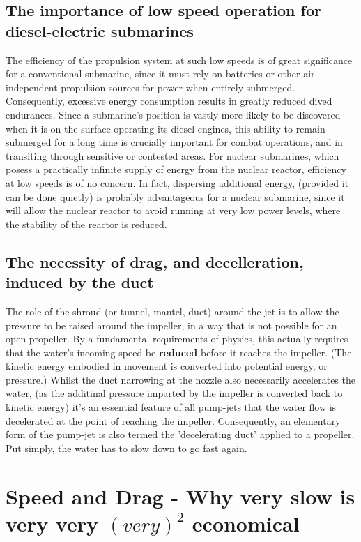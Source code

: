 \documentclass{article}\usepackage[]{graphicx}\usepackage[]{color}
\begin{document}
\subsection{The importance of low speed operation for diesel-electric submarines}

The efficiency of the propulsion system at such low speeds is of great significance for a conventional submarine, since it must rely on batteries or other air-independent propulsion sources for power when entirely submerged.  Consequently, excessive energy consumption results in greatly reduced dived endurances.  Since a submarine's position is vastly more likely to be discovered when it is on the surface operating its diesel engines, this ability to remain submerged for a long time is crucially important for combat operations, and in transiting through sensitive or contested areas.  For nuclear submarines, which posess a practically infinite supply of energy from the nuclear reactor, efficiency at low speeds is of no concern.  In fact, dispersing additional energy, (provided it can be done quietly) is probably advantageous for a nuclear submarine, since it will allow the nuclear reactor to avoid running at very low power levels, where the stability of the reactor is reduced.

\subsection{The necessity of drag, and decelleration, induced by the duct}

The role of the shroud (or tunnel, mantel, duct) around the jet is to allow the pressure to be raised around the impeller, in a way that is not possible for an open propeller.  By a fundamental requirements of physics, this actually requires that the water's incoming speed be \textbf{reduced} before it reaches the impeller. (The kinetic energy embodied in movement is converted into potential energy, or pressure.)  Whilst the duct narrowing at the nozzle also necessarily accelerates the water, (as the additinal pressure imparted by the impeller is converted back to kinetic energy) it's an essential feature of all pump-jets that the water flow is decelerated at the point of reaching the impeller. Consequently, an elementary form of the pump-jet is also termed the 'decelerating duct' applied to a propeller.  Put simply, the water has to slow down to go fast again.


\section{Speed and Drag - Why very slow is very very $(very)^2$ economical}
\end{document}
